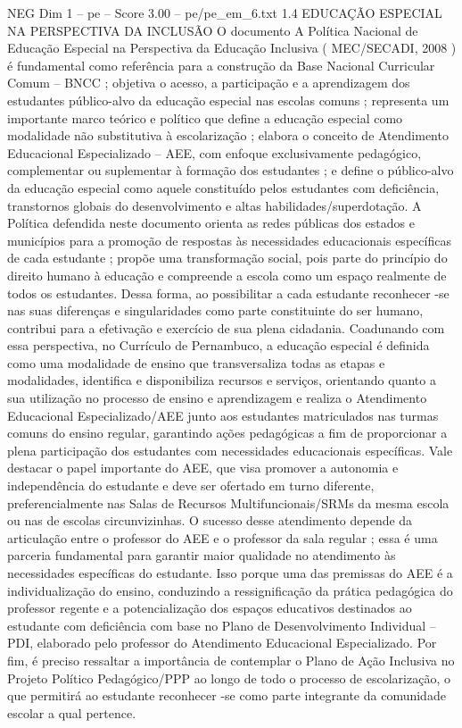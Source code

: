 \begin{textsample}{NEG Dim 1 – pe – Score 3.00 – pe/pe\_em\_6.txt}  \label{ex:f1_neg_049}
1.4 EDUCAÇÃO ESPECIAL NA PERSPECTIVA DA INCLUSÃO O documento A Política Nacional de Educação Especial na Perspectiva da Educação Inclusiva ( MEC/SECADI, 2008 ) é fundamental como referência para a construção da Base Nacional Curricular Comum – BNCC ; objetiva o acesso, a participação e a aprendizagem dos estudantes público-alvo da educação especial nas escolas comuns ; representa um importante marco teórico e político que define a educação especial como modalidade não substitutiva à escolarização ; elabora o conceito de Atendimento Educacional Especializado – AEE, com enfoque exclusivamente pedagógico, complementar ou suplementar à formação dos estudantes ; e define o público-alvo da educação especial como aquele constituído pelos estudantes com deficiência, transtornos globais do desenvolvimento e altas habilidades/superdotação.
A Política defendida neste documento orienta as redes públicas dos estados e municípios para a promoção de respostas às necessidades educacionais específicas de cada estudante ; propõe uma transformação social, pois parte do princípio do direito humano à educação e compreende a escola como um espaço realmente de todos os estudantes.
Dessa forma, ao possibilitar a cada estudante reconhecer -se nas suas diferenças e singularidades como parte constituinte do ser humano, contribui para a efetivação e exercício de sua plena cidadania.
Coadunando com essa perspectiva, no Currículo de Pernambuco, a educação especial é definida como uma modalidade de ensino que transversaliza todas as etapas e modalidades, identifica e disponibiliza recursos e serviços, orientando quanto a sua utilização no processo de ensino e aprendizagem e realiza o Atendimento Educacional Especializado/AEE junto aos estudantes matriculados nas turmas comuns do ensino regular, garantindo ações pedagógicas a fim de proporcionar a plena participação dos estudantes com necessidades educacionais específicas.
Vale destacar o papel importante do AEE, que visa promover a autonomia e independência do estudante e deve ser ofertado em turno diferente, preferencialmente nas Salas de Recursos Multifuncionais/SRMs da mesma escola ou nas de escolas circunvizinhas.
O sucesso desse atendimento depende da articulação entre o professor do AEE e o professor da sala regular ; essa é uma parceria fundamental para garantir maior qualidade no atendimento às necessidades específicas do estudante.
Isso porque uma das premissas do AEE é a individualização do ensino, conduzindo a ressignificação da prática pedagógica do professor regente e a potencialização dos espaços educativos destinados ao estudante com deficiência com base no Plano de Desenvolvimento Individual – PDI, elaborado pelo professor do Atendimento Educacional Especializado.
Por fim, é preciso ressaltar a importância de contemplar o Plano de Ação Inclusiva no Projeto Político Pedagógico/PPP ao longo de todo o processo de escolarização, o que permitirá ao estudante reconhecer -se como parte integrante da comunidade escolar a qual pertence.

\end{textsample}
